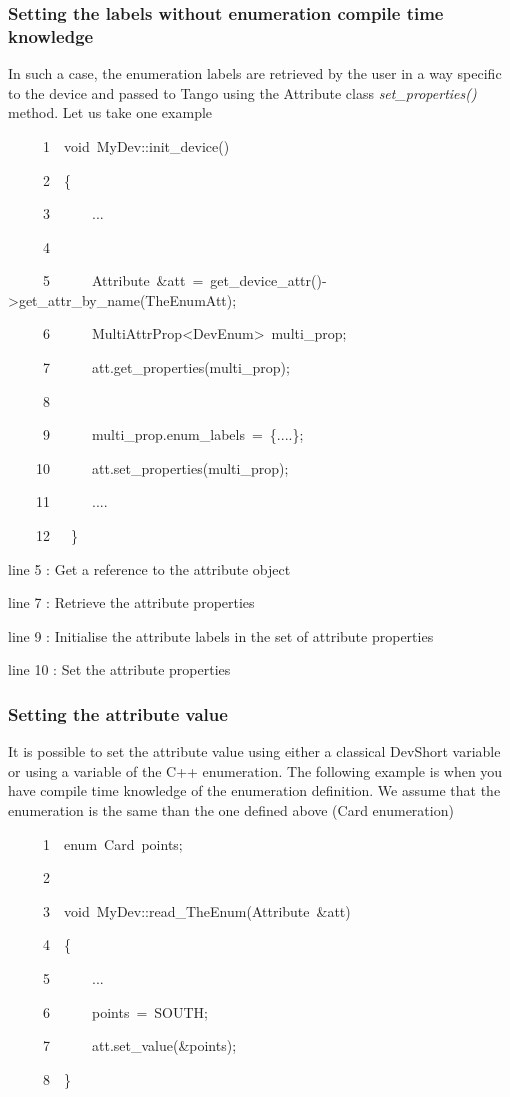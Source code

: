 \subsubsection{Setting the labels without enumeration compile time knowledge}

In such a case, the enumeration labels are retrieved by the user in
a way specific to the device and passed to Tango using the Attribute
class \emph{set\_properties()} method. Let us take one example


\begin{lyxcode}
~~~~~1~~void~MyDev::init\_device()

~~~~~2~~\{

~~~~~3~~~~~~...

~~~~~4~~

~~~~~5~~~~~~Attribute~\&att~=~get\_device\_attr()->get\_attr\_by\_name(\textquotedbl{}TheEnumAtt\textquotedbl{});

~~~~~6~~~~~~MultiAttrProp<DevEnum>~multi\_prop;

~~~~~7~~~~~~att.get\_properties(multi\_prop);

~~~~~8~

~~~~~9~~~~~~multi\_prop.enum\_labels~=~\{....\};

~~~~10~~~~~~att.set\_properties(multi\_prop);

~~~~11~~~~~~....

~~~~12~~~\}	
\end{lyxcode}


line 5 : Get a reference to the attribute object

line 7 : Retrieve the attribute properties

line 9 : Initialise the attribute labels in the set of attribute properties

line 10 : Set the attribute properties


\subsubsection{Setting the attribute value}

It is possible to set the attribute value using either a classical
DevShort variable or using a variable of the C++ enumeration. The
following example is when you have compile time knowledge of the enumeration
definition. We assume that the enumeration is the same than the one
defined above (Card enumeration)


\begin{lyxcode}
~~~~~1~~enum~Card~points;

~~~~~2~~

~~~~~3~~void~MyDev::read\_TheEnum(Attribute~\&att)

~~~~~4~~\{

~~~~~5~~~~~~...

~~~~~6~~~~~~points~=~SOUTH;

~~~~~7~~~~~~att.set\_value(\&points);

~~~~~8~~\}
\end{lyxcode}


